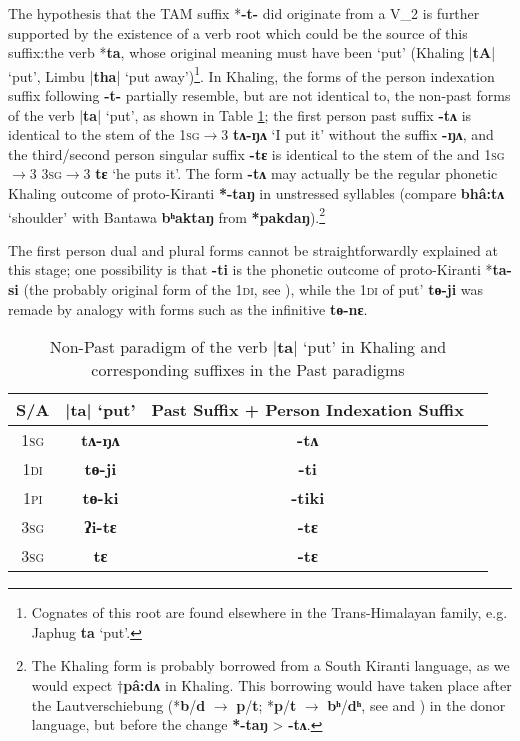 \documentclass[oneside,a4paper,11pt]{article}
\newcommand{\ipa}[1]{{\phon\textbf{#1}}}
\newcommand{\dhatu}[2]{|\ipa{#1}| `#2'}
\begin{document}
The hypothesis that the TAM suffix *\ipa{-t-} did originate from a V_2 is further supported by the existence of a verb root which could be the source of this suffix:the verb *\ipa{ta}, whose original meaning must have been `put' (Khaling \dhatu{tA}{put}, Limbu \dhatu{tha}{put away})\footnote{Cognates of this root are found elsewhere in the Trans-Himalayan family, e.g. Japhug \ipa{ta} `put'.}.  In Khaling, the forms of the person indexation suffix  following \ipa{-t-} partially resemble, but are not identical to, the non-past forms of the verb \dhatu{ta}{put}, as shown in Table \ref{tab:tANA}; the first person past suffix \ipa{-tʌ} is identical to the stem of the \textsc{1sg$\rightarrow$3}  \ipa{tʌ-ŋʌ} `I put it' without the suffix \ipa{-ŋʌ}, and the third/second person singular suffix \ipa{-tɛ} is identical to the stem of the and \textsc{1sg$\rightarrow$3} \textsc{3sg$\rightarrow$3}  \ipa{tɛ} `he puts it'. The form \ipa{-tʌ} may actually be the regular phonetic Khaling outcome of proto-Kiranti \ipa{*-taŋ} in unstressed syllables (compare \ipa{bhâ:tʌ} `shoulder' with Bantawa \ipa{bʰaktaŋ} from \ipa{*pakdaŋ}).\footnote{The Khaling form is probably borrowed from a South Kiranti language, as we would expect $\dagger$\ipa{pâ:dʌ} in Khaling. This borrowing would have taken place after the Lautverschiebung (*\ipa{b}/\ipa{d} $\rightarrow$ \ipa{p}/\ipa{t}; *\ipa{p}/\ipa{t} $\rightarrow$ \ipa{bʰ}/\ipa{dʰ}, see \citealt{michailovsky94stops} and \citealt{jacques17pkiranti}) in the donor language, but before the change \ipa{*-taŋ} > \ipa{-tʌ}.}


 The first person dual and plural forms cannot be straightforwardly explained at this stage; one possibility is that \ipa{-ti} is the phonetic outcome of proto-Kiranti *\ipa{ta-si} (the probably original form of the \textsc{1di}, see \citealt[58]{jacques16tonogenesis}), while the \textsc{1di} of  put' \ipa{tɵ-ji} was remade by analogy with forms such as the infinitive \ipa{tɵ-nɛ}.

\begin{table}[H]
\caption{Non-Past paradigm of the verb \dhatu{ta}{put} in Khaling and corresponding suffixes in the Past paradigms} \centering \label{tab:tANA}
\begin{tabular}{cccc}
\toprule
S/A & \dhatu{ta}{put} & Past Suffix + Person Indexation Suffix \\
\midrule
\textsc{1sg} & \ipa{tʌ-ŋʌ} &  \ipa{-tʌ}  \\
\textsc{1di} & \ipa{tɵ-ji} &  \ipa{-ti}  \\
\textsc{1pi} & \ipa{tɵ-ki} & \ipa{-tiki}  \\
\textsc{3sg} & \ipa{ʔi-tɛ} & \ipa{-tɛ}  \\
\textsc{3sg} & \ipa{tɛ} & \ipa{-tɛ}  \\
\bottomrule
\end{tabular}
\end{table}
\end{document}
